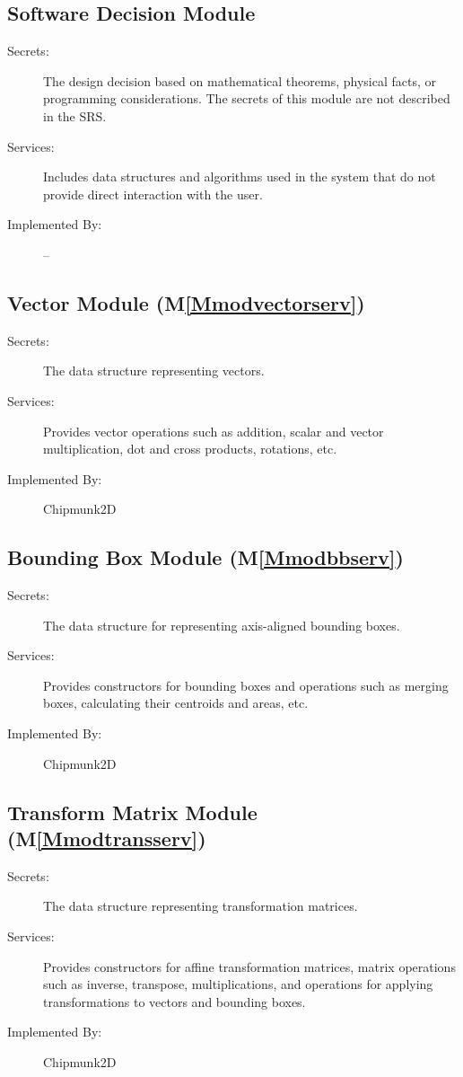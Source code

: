 \documentclass[12pt]{article}
\begin{document}
\subsection{Software Decision Module}
\label{Sec:SDM}
\begin{description}
\item[Secrets:]The design decision based on mathematical theorems, physical facts, or programming considerations. The secrets of this module are not described in the SRS.
\item[Services:]Includes data structures and algorithms used in the system that do not provide direct interaction with the user.
\item[Implemented By:]--
\end{description}
\subsection{Vector Module (M\ref{Mmodvectorserv})}
\label{Sec:VM()}
\begin{description}
\item[Secrets:]The data structure representing vectors.
\item[Services:]Provides vector operations such as addition, scalar and vector multiplication, dot and cross products, rotations, etc.
\item[Implemented By:]Chipmunk2D
\end{description}
\subsection{Bounding Box Module (M\ref{Mmodbbserv})}
\label{Sec:BBM()}
\begin{description}
\item[Secrets:]The data structure for representing axis-aligned bounding boxes.
\item[Services:]Provides constructors for bounding boxes and operations such as merging boxes, calculating their centroids and areas, etc.
\item[Implemented By:]Chipmunk2D
\end{description}
\subsection{Transform Matrix Module (M\ref{Mmodtransserv})}
\label{Sec:TMM()}
\begin{description}
\item[Secrets:]The data structure representing transformation matrices.
\item[Services:]Provides constructors for affine transformation matrices, matrix operations such as inverse, transpose, multiplications, and operations for applying transformations to vectors and bounding boxes.
\item[Implemented By:]Chipmunk2D
\end{description}
\end{document}
